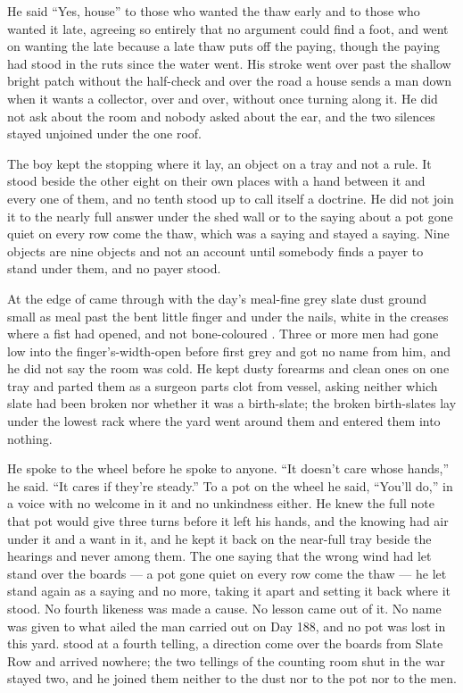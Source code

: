 He said “Yes, house” to those who wanted the thaw early and to those who wanted it late, agreeing so entirely that no argument could find a foot, and went on wanting the late because a late thaw puts off the paying, though the paying had stood in the ruts since the water went. His stroke went over  past the shallow bright patch without the half-check and over the road a house sends a man down when it wants a collector, over and over, without once turning along it. He did not ask about the room and nobody asked about the ear, and the two silences stayed unjoined under the one roof.

The boy kept the stopping where it lay, an object on a tray and not a rule. It stood beside the other eight on their own places with a hand between it and every one of them, and no tenth stood up to call itself a doctrine. He did not join it to the nearly full answer under the shed wall or to the saying about a pot gone quiet on every row come the thaw, which was a saying and stayed a saying. Nine objects are nine objects and not an account until somebody finds a payer to stand under them, and no payer stood.

At the edge of   came through with the day's meal-fine grey slate dust ground small as meal past the bent little finger and under the nails, white in the creases where a fist had opened, and not bone-coloured . Three or more men had gone low into the finger's-width-open  before first grey and got no name from him, and he did not say the room was cold. He kept dusty forearms and clean ones on one tray and parted them as a surgeon parts clot from vessel, asking neither which slate had been broken nor whether it was a birth-slate; the broken birth-slates lay under the lowest rack where the yard went around them and entered them into nothing.

He spoke to the wheel before he spoke to anyone. “It doesn't care whose hands,” he said. “It cares if they're steady.” To a pot on the wheel he said, “You'll do,” in a voice with no welcome in it and no unkindness either. He knew the full note that pot would give three turns before it left his hands, and the knowing had air under it and a want in it, and he kept it back on the near-full tray beside the hearings and never among them. The one saying that the wrong wind had let stand over the boards --- a pot gone quiet on every row come the thaw --- he let stand again as a saying and no more, taking it apart and setting it back where it stood. No fourth likeness was made a cause. No lesson came out of it. No name was given to what ailed the man carried out on Day 188, and no pot was lost in this yard.  stood at a fourth telling, a direction come over the boards from Slate Row and arrived nowhere; the two tellings of the counting room shut in the war stayed two, and he joined them neither to the dust nor to the pot nor to the men.


